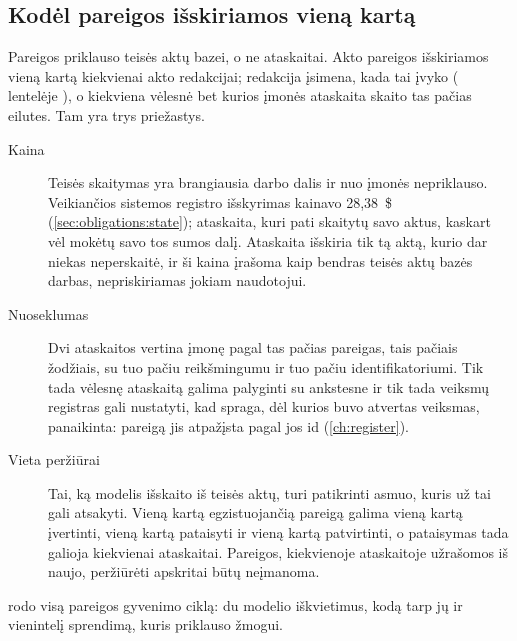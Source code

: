 \subsection{Kodėl pareigos išskiriamos vieną kartą}\label{sec:obligations:once}

Pareigos priklauso teisės aktų bazei, o ne ataskaitai. Akto pareigos išskiriamos vieną kartą
kiekvienai akto redakcijai; redakcija įsimena, kada tai įvyko (
lentelėje ), o kiekviena vėlesnė bet kurios įmonės ataskaita
skaito tas pačias eilutes. Tam yra trys priežastys.

\begin{description}
  \item[Kaina] Teisės skaitymas yra brangiausia darbo dalis ir nuo įmonės nepriklauso. Veikiančios
    sistemos registro išskyrimas kainavo 28,38~\$ (\cref{sec:obligations:state}); ataskaita,
    kuri pati skaitytų savo aktus, kaskart vėl mokėtų savo tos sumos dalį. Ataskaita išskiria
    tik tą aktą, kurio dar niekas neperskaitė, ir ši kaina įrašoma kaip bendras teisės aktų bazės
    darbas, nepriskiriamas jokiam naudotojui.
  \item[Nuoseklumas] Dvi ataskaitos vertina įmonę pagal tas pačias pareigas, tais pačiais
    žodžiais, su tuo pačiu reikšmingumu ir tuo pačiu identifikatoriumi. Tik tada vėlesnę
    ataskaitą galima palyginti su ankstesne ir tik tada veiksmų registras gali nustatyti, kad
    spraga, dėl kurios buvo atvertas veiksmas, panaikinta: pareigą jis atpažįsta pagal jos id
    (\cref{ch:register}).
  \item[Vieta peržiūrai] Tai, ką modelis išskaito iš teisės aktų, turi patikrinti asmuo, kuris už
    tai gali atsakyti. Vieną kartą egzistuojančią pareigą galima vieną kartą įvertinti, vieną
    kartą pataisyti ir vieną kartą patvirtinti, o pataisymas tada galioja kiekvienai ataskaitai.
    Pareigos, kiekvienoje ataskaitoje užrašomos iš naujo, peržiūrėti apskritai būtų neįmanoma.
\end{description}

 rodo visą pareigos gyvenimo ciklą: du modelio iškvietimus, kodą tarp
jų ir vienintelį sprendimą, kuris priklauso žmogui.

